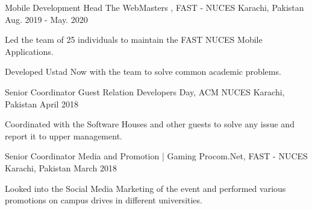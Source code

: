 
\begin{cventries}
  \cventry
    {Mobile Development Head} %
    {The WebMasters , FAST - NUCES} %
    {Karachi, Pakistan} %
    {Aug. 2019 - May. 2020} %
    {
      \begin{cvitems} %
        \item {Led the team of 25 individuals to maintain the FAST NUCES Mobile Applications.}
        \item {Developed Ustad Now with the team to solve common academic problems. }
      \end{cvitems}
    }

  \cventry
    {Senior Coordinator Guest Relation} %
    {Developers Day, ACM NUCES} %
    {Karachi, Pakistan} %
    {April 2018} %
    {
      \begin{cvitems} %
      	\item {Coordinated with the Software Houses and other guests to solve any issue and report it to upper management.}
      \end{cvitems}
    }
    
    \cventry
    {Senior Coordinator Media and Promotion | Gaming} %
    {Procom.Net, FAST - NUCES} %
    {Karachi, Pakistan} %
    {March 2018} %
    {
      \begin{cvitems} %
      	\item {Looked into the Social Media Marketing of the event and performed various promotions on campus drives in different universities.}
      \end{cvitems}
    }
\end{cventries}